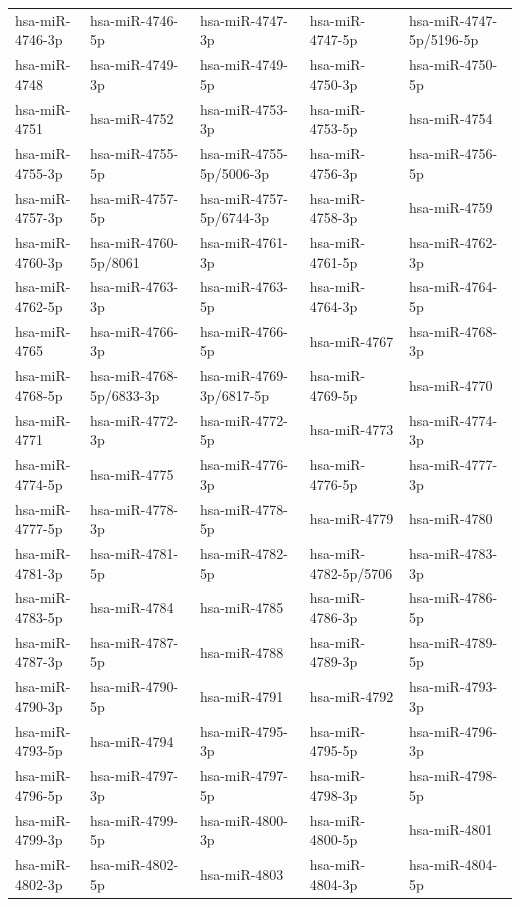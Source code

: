 \begin{longtable}{lllll}
hsa-miR-4746-3p & hsa-miR-4746-5p & hsa-miR-4747-3p & hsa-miR-4747-5p & hsa-miR-4747-5p/5196-5p \\
hsa-miR-4748 & hsa-miR-4749-3p & hsa-miR-4749-5p & hsa-miR-4750-3p & hsa-miR-4750-5p \\
hsa-miR-4751 & hsa-miR-4752 & hsa-miR-4753-3p & hsa-miR-4753-5p & hsa-miR-4754 \\
hsa-miR-4755-3p & hsa-miR-4755-5p & hsa-miR-4755-5p/5006-3p & hsa-miR-4756-3p & hsa-miR-4756-5p \\
hsa-miR-4757-3p & hsa-miR-4757-5p & hsa-miR-4757-5p/6744-3p & hsa-miR-4758-3p & hsa-miR-4759 \\
hsa-miR-4760-3p & hsa-miR-4760-5p/8061 & hsa-miR-4761-3p & hsa-miR-4761-5p & hsa-miR-4762-3p \\
hsa-miR-4762-5p & hsa-miR-4763-3p & hsa-miR-4763-5p & hsa-miR-4764-3p & hsa-miR-4764-5p \\
hsa-miR-4765 & hsa-miR-4766-3p & hsa-miR-4766-5p & hsa-miR-4767 & hsa-miR-4768-3p \\
hsa-miR-4768-5p & hsa-miR-4768-5p/6833-3p & hsa-miR-4769-3p/6817-5p & hsa-miR-4769-5p & hsa-miR-4770 \\
hsa-miR-4771 & hsa-miR-4772-3p & hsa-miR-4772-5p & hsa-miR-4773 & hsa-miR-4774-3p \\
hsa-miR-4774-5p & hsa-miR-4775 & hsa-miR-4776-3p & hsa-miR-4776-5p & hsa-miR-4777-3p \\
hsa-miR-4777-5p & hsa-miR-4778-3p & hsa-miR-4778-5p & hsa-miR-4779 & hsa-miR-4780 \\
hsa-miR-4781-3p & hsa-miR-4781-5p & hsa-miR-4782-5p & hsa-miR-4782-5p/5706 & hsa-miR-4783-3p \\
hsa-miR-4783-5p & hsa-miR-4784 & hsa-miR-4785 & hsa-miR-4786-3p & hsa-miR-4786-5p \\
hsa-miR-4787-3p & hsa-miR-4787-5p & hsa-miR-4788 & hsa-miR-4789-3p & hsa-miR-4789-5p \\
hsa-miR-4790-3p & hsa-miR-4790-5p & hsa-miR-4791 & hsa-miR-4792 & hsa-miR-4793-3p \\
hsa-miR-4793-5p & hsa-miR-4794 & hsa-miR-4795-3p & hsa-miR-4795-5p & hsa-miR-4796-3p \\
hsa-miR-4796-5p & hsa-miR-4797-3p & hsa-miR-4797-5p & hsa-miR-4798-3p & hsa-miR-4798-5p \\
hsa-miR-4799-3p & hsa-miR-4799-5p & hsa-miR-4800-3p & hsa-miR-4800-5p & hsa-miR-4801 \\
hsa-miR-4802-3p & hsa-miR-4802-5p & hsa-miR-4803 & hsa-miR-4804-3p & hsa-miR-4804-5p \\

\end{longtable}
